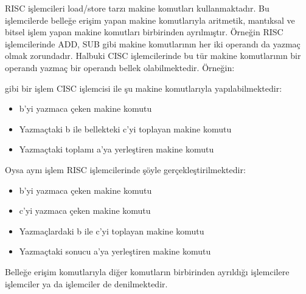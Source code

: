 \documentclass[letterpaper,10pt,turkish]{sphinxmanual}
\begin{document}
\begin{description}
\sphinxAtStartPar
RISC işlemcileri load/store tarzı makine komutları kullanmaktadır. Bu işlemcilerde belleğe
erişim yapan makine komutlarıyla aritmetik, mantıksal ve bitsel işlem yapan makine komutları
birbirinden ayrılmıştır. Örneğin RISC işlemcilerinde ADD, SUB gibi makine komutlarının her
iki operandı da yazmaç olmak zorundadır. Halbuki CISC işlemcilerinde bu tür makine komutlarının
bir operandı yazmaç bir operandı bellek olabilmektedir. Örneğin:

\begin{sphinxVerbatim}[commandchars=\\\{\}]
    
\end{sphinxVerbatim}

\sphinxAtStartPar
gibi bir işlem CISC işlemcisi ile şu makine komutlarıyla yapılabilmektedir:
\begin{itemize}
\item {} 
\sphinxAtStartPar
b’yi yazmaca çeken makine komutu

\item {} 
\sphinxAtStartPar
Yazmaçtaki b ile bellekteki c’yi toplayan makine komutu

\item {} 
\sphinxAtStartPar
Yazmaçtaki toplamı a’ya yerleştiren makine komutu

\end{itemize}

\sphinxAtStartPar
Oysa aynı işlem RISC işlemcilerinde şöyle gerçekleştirilmektedir:
\begin{itemize}
\item {} 
\sphinxAtStartPar
b’yi yazmaca çeken makine komutu

\item {} 
\sphinxAtStartPar
c’yi yazmaca çeken makine komutu

\item {} 
\sphinxAtStartPar
Yazmaçlardaki b ile c’yi toplayan makine komutu

\item {} 
\sphinxAtStartPar
Yazmaçtaki sonucu a’ya yerleştiren makine komutu

\end{itemize}

\sphinxAtStartPar
Belleğe erişim komutlarıyla diğer komutların birbirinden ayrıldığı işlemcilere 
işlemciler ya da  işlemciler de denilmektedir.


\end{description}
\end{document}
